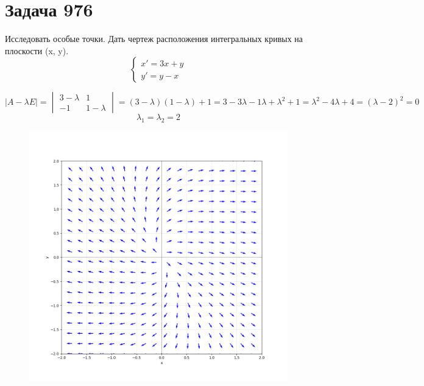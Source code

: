 \section*{Задача 976}
Исследовать особые точки. Дать чертеж расположения интегральных кривых на плоскости (x, y).
$$
    \begin{cases}
        x' = 3x + y \\
        y' = y - x
    \end{cases}
$$
\begin{solution}
    $$ |A - \lambda E| = \begin{vmatrix}
            3 - \lambda & 1           \\
            -1            & 1 - \lambda
        \end{vmatrix} = (3-\lambda)(1 - \lambda) + 1 = 3 - 3\lambda - 1\lambda + \lambda^2 + 1 = \lambda^2 - 4\lambda + 4 = (\lambda - 2)^2 = 0
    $$
    $$ \lambda_1 = \lambda_2 = 2 $$
    \begin{figure}[h]

        \centering
        
        \includegraphics[width=0.8\linewidth]{graph/976.png}
                
        \label{fig:mpr}
        
    \end{figure}

\end{solution}\pagebreak
